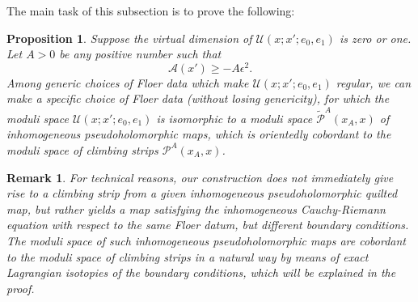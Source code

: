 \documentclass{amsart}
\newtheorem{proposition}[theorem]{Proposition}
\newtheorem{remark}[theorem]{Remark}
\numberwithin{equation}{section}
\numberwithin{figure}{section}
\begin{document}
	The main task of this subsection is to prove the following: \par

\begin{proposition}
	Suppose the virtual dimension of $\mathcal{U}(x; x'; e_{0}, e_{1})$ is zero or one. Let $A > 0$ be any positive number such that
\begin{equation}
\mathcal{A}(x') \ge -A\epsilon^{2}.
\end{equation}	
Among generic choices of Floer data which make $\mathcal{U}(x; x'; e_{0}, e_{1})$ regular, we can make a specific choice of Floer data (without losing genericity), for which the moduli space $\mathcal{U}(x; x'; e_{0}, e_{1})$ is isomorphic to a moduli space $\tilde{\mathcal{P}}^{A}(x_{A}, x)$ of inhomogeneous pseudoholomorphic maps, which is orientedly cobordant to the moduli space of climbing strips $\mathcal{P}^{A}(x_{A}, x)$.
\end{proposition}

\begin{remark}
	For technical reasons, our construction does not immediately give rise to a climbing strip from a given inhomogeneous pseudoholomorphic quilted map, but rather yields a map satisfying the inhomogeneous Cauchy-Riemann equation with respect to the same Floer datum, but different boundary conditions. The moduli space of such inhomogeneous pseudoholomorphic maps are cobordant to the moduli space of climbing strips in a natural way by means of exact Lagrangian isotopies of the boundary conditions, which will be explained in the proof.
\end{remark}
\end{document}
